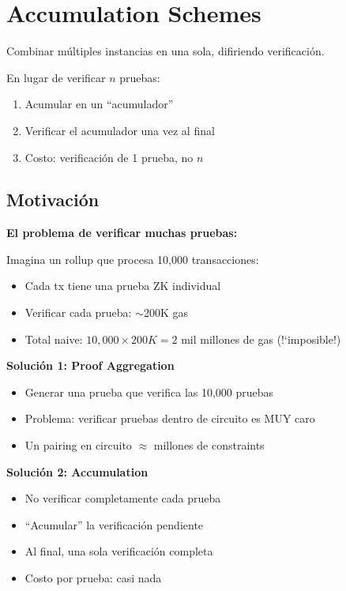 \documentclass[11pt,a4paper,twoside]{book}
\begin{document}
\section{Accumulation Schemes}

\begin{definition}[Accumulation]
Combinar m\'ultiples instancias en una sola, difiriendo verificaci\'on.
\end{definition}

En lugar de verificar $n$ pruebas:
\begin{enumerate}
    \item Acumular en un ``acumulador''
    \item Verificar el acumulador una vez al final
    \item Costo: verificaci\'on de 1 prueba, no $n$
\end{enumerate}

\subsection{Motivaci\'on}

\begin{intuicion}
\textbf{El problema de verificar muchas pruebas:}

Imagina un rollup que procesa 10,000 transacciones:
\begin{itemize}
    \item Cada tx tiene una prueba ZK individual
    \item Verificar cada prueba: $\sim$200K gas
    \item Total naive: $10,000 \times 200K = 2$ mil millones de gas (!`imposible!)
\end{itemize}

\textbf{Soluci\'on 1: Proof Aggregation}
\begin{itemize}
    \item Generar una prueba que verifica las 10,000 pruebas
    \item Problema: verificar pruebas dentro de circuito es MUY caro
    \item Un pairing en circuito $\approx$ millones de constraints
\end{itemize}

\textbf{Soluci\'on 2: Accumulation}
\begin{itemize}
    \item No verificar completamente cada prueba
    \item ``Acumular'' la verificaci\'on pendiente
    \item Al final, una sola verificaci\'on completa
    \item Costo por prueba: casi nada
\end{itemize}
\end{intuicion}
\end{document}
